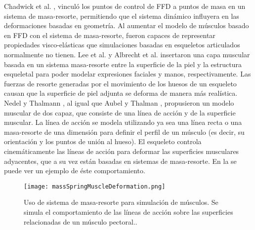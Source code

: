 Chadwick et al. \citep{Chadwick:1989}, vinculó los puntos de control de FFD a puntos de masa en un sistema de masa-resorte, permitiendo que el sistema dinámico influyera en las deformaciones basadas en geometría. Al aumentar el modelo de músculos basado en FFD con el sistema de masa-resorte, fueron capaces de representar propiedades visco-elásticas que simulaciones basadas en esqueletos articulados normalmente no tienen. Lee et al. \citep{lee1995realistic} y Albrecht et al. \citep{albrecht2003construction} insertaron una capa muscular basada en un sistema masa-resorte entre la superficie de la piel y la estructura esqueletal para poder modelar expresiones faciales y manos, respectivamente. Las fuerzas de resorte generadas por el movimiento de los huesos de un esqueleto causan que la superficie de piel adjunta se deforma de manera más realística. Nedel y Thalmann \citep{nedel1998real}, al igual que Aubel y Thalman \citep{aubel2001interactive}, propusieron un modelo muscular de dos capaz, que consiste de una línea de acción y de la superficie muscular. La línea de acción se modela utilizando ya sea una línea recta  \citep{nedel1998real} o una masa-resorte de una dimensión \citep{aubel2001interactive} para definir el perfil de un músculo (es decir, su orientación y los puntos de unión al hueso). El esqueleto controla cinemáticamente las líneas de acción para deformar las superficies musculares adyacentes, que a su vez están basadas en sistemas de masa-resorte. En la  se puede ver un ejemplo de éste comportamiento.

\begin{figure}
	\centering
		\texttt{[image: massSpringMuscleDeformation.png]}
	\caption[Uso de sistema de masa-resorte para simulación de músculos.]{Uso de sistema de masa-resorte para simulación de músculos. Se simula el comportamiento de las líneas de acción sobre las superficies relacionadas de un músculo pectoral.\citep{aubel2001interactive}.}
		\label{fig:massSpringMuscleDeformation}
\end{figure}

